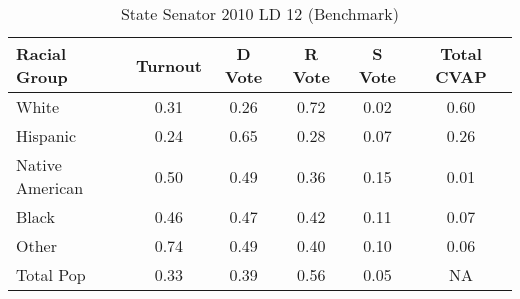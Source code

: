 \begin{table}[htb]
\begin{center}
\caption{State Senator 2010 LD 12 (Benchmark)}
\label{stsen10_cvap_ld_12_benchmark}
\begin{tabular}{lccccc}
  \hline
Racial Group & Turnout & D Vote & R Vote & S Vote & Total CVAP \\ 
  \hline
    White & 0.31  & 0.26  & 0.72  & 0.02  & 0.60 \\
    Hispanic & 0.24  & 0.65  & 0.28  & 0.07  & 0.26 \\
    Native American & 0.50  & 0.49  & 0.36  & 0.15  & 0.01 \\
    Black & 0.46  & 0.47  & 0.42  & 0.11  & 0.07 \\
    Other & 0.74  & 0.49  & 0.40  & 0.10  & 0.06 \\
    Total Pop & 0.33  & 0.39  & 0.56  & 0.05  & NA \\
   \hline
\end{tabular}
\end{center}
\end{table}